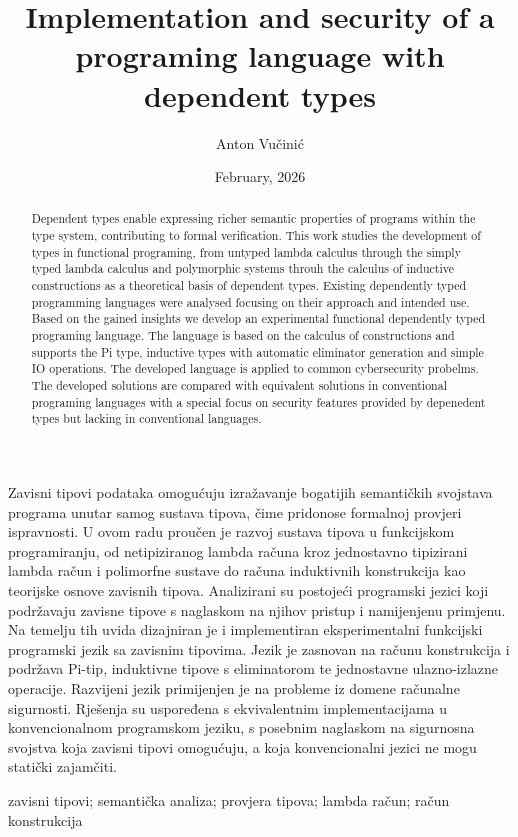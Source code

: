 \documentclass[diplomskirad,upload]{fer}
\title{Implementation and security of a programing language with dependent types}
\author{Anton Vučinić}
\date{February, 2026}
\begin{document}
\maketitle


\begin{zahvale}
\end{zahvale}

\mainmatter

\begin{sazetak}
Zavisni tipovi podataka omogućuju izražavanje bogatijih semantičkih svojstava
programa unutar samog sustava tipova, čime pridonose formalnoj provjeri
ispravnosti. U ovom radu proučen je razvoj sustava tipova u funkcijskom
programiranju, od netipiziranog lambda računa kroz jednostavno tipizirani lambda
račun i polimorfne sustave do računa induktivnih konstrukcija kao teorijske
osnove zavisnih tipova. Analizirani su postojeći programski jezici koji
podržavaju zavisne tipove s naglaskom na njihov
pristup i namijenjenu primjenu. Na temelju tih uvida dizajniran je i
implementiran eksperimentalni funkcijski programski jezik sa zavisnim tipovima.
Jezik je zasnovan na računu konstrukcija i podržava Pi-tip, induktivne tipove s
eliminatorom te jednostavne ulazno-izlazne operacije. Razvijeni jezik primijenjen je na probleme iz domene
računalne sigurnosti. Rješenja su uspoređena s ekvivalentnim
implementacijama u konvencionalnom programskom jeziku, s posebnim naglaskom na
sigurnosna svojstva koja zavisni tipovi omogućuju, a koja konvencionalni jezici
ne mogu statički zajamčiti.
\end{sazetak}

\begin{kljucnerijeci}
    zavisni tipovi; semantička analiza; provjera tipova; lambda račun; račun konstrukcija
\end{kljucnerijeci}


\begin{abstract}
Dependent types enable expressing richer semantic properties of programs within
the type system, contributing to formal verification. This work studies the
development of types in functional programing, from untyped lambda calculus
through the simply typed lambda calculus and polymorphic systems throuh the
calculus of inductive constructions as a theoretical basis of dependent types.
Existing dependently typed programming languages were analysed focusing on their
approach and intended use. Based on the gained insights we develop an
experimental functional dependently typed programing language. The language is
based on the calculus of constructions and supports the Pi type, inductive types
with automatic eliminator generation and simple IO operations. The developed
language is applied to common cybersecurity probelms. The developed solutions
are compared with equivalent solutions in conventional programing languages with
a special focus on security features provided by depenedent types but lacking in
conventional languages.
\end{abstract}
\end{document}
